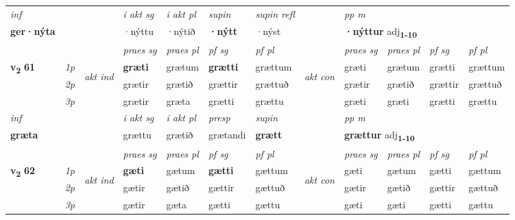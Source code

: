\begin{longtable}[l]{X>{\footnotesize\itshape}llXXXXlXXXX}
   {\textit{inf}} & &  & \textit{i akt sg} & \textit{i akt pl}    & \textit{supin} & \textit{supin refl} && \textit{pp m} \\*
  {\textbf{ger\allowbreak ·nýta}} & && ·nýttu  & ·nýtið    &  \textbf{·nýtt} & ·nýst && \multicolumn{2}{l}{\textbf{·nýttur} adj\textbf{\textsubscript{1-10}}} \\*

\midrule

 & &   & \textit{praes sg}  & \textit{praes pl}    & \textit{ pf sg} & \textit{pf pl} & & \textit{praes sg}  & \textit{praes pl}    & \textit{pf sg} & \textit{pf pl }  \\ \cmidrule{4-7} \cmidrule{9-12}
 \multirow{2}{*}{{{\textbf{v{\textsubscript{2}}} \Large{\textbf{61}}}}}  & 1p & \multirow{3}{*}{\begin{turn}{90}\textit{akt ind}\end{turn}} & \textbf{græti} & grætum & \textbf{grætti} & grættum & \multirow{3}{*}{\begin{turn}{90}\textit{akt con}\end{turn}} &græti & grætum & grætti & grættum\\*
 & 2p &  &  grætir  & grætið & grættir & grættuð & & grætir & grætið & grættir & grættuð \\*
 & 3p &  & grætir & græta & grætti & grættu & & græti & græti& grætti & grættu \\*
\cmidrule{4-7} \cmidrule{9-12}

   {\textit{inf}} & &  & \textit{i akt sg} & \textit{i akt pl}   & \textit{presp} & \textit{supin}  && \textit{pp m} \\*
  {\textbf{græta}} & && grættu  & grætið   & grætandi &  \textbf{grætt}  && \multicolumn{2}{l}{\textbf{grættur} adj\textbf{\textsubscript{1-10}}} \\*

\midrule

\midrule
 & &   & \textit{praes sg}  & \textit{praes pl}    & \textit{ pf sg} & \textit{pf pl} & & \textit{praes sg}  & \textit{praes pl}    & \textit{pf sg} & \textit{pf pl }  \\ \cmidrule{4-7} \cmidrule{9-12}
 \multirow{2}{*}{{{\textbf{v{\textsubscript{2}}} \Large{\textbf{62}}}}}  & 1p & \multirow{3}{*}{\begin{turn}{90}\textit{akt ind}\end{turn}} & \textbf{gæti} & gætum & \textbf{gætti} & gættum & \multirow{3}{*}{\begin{turn}{90}\textit{akt con}\end{turn}} &gæti & gætum & gætti & gættum\\*
 & 2p &  &  gætir  & gætið & gættir & gættuð & & gætir & gætið & gættir & gættuð \\*
 & 3p &  & gætir & gæta & gætti & gættu & & gæti & gæti& gætti & gættu \\*
\cmidrule{4-7} \cmidrule{9-12}


\end{longtable}

